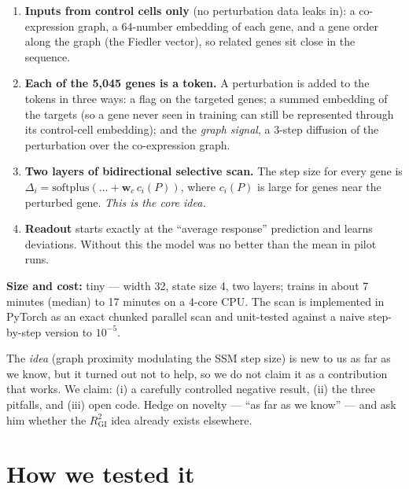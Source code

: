 \documentclass[10.5pt]{article}
\begin{document}
\begin{enumerate}
\item \textbf{Inputs from control cells only} (no perturbation data leaks in): a co-expression graph,
a 64-number embedding of each gene, and a gene order along the graph (the Fiedler vector), so related genes
sit close in the sequence.
\item \textbf{Each of the 5,045 genes is a token.} A perturbation is added to the tokens in three ways:
a flag on the targeted genes; a summed embedding of the targets (so a gene never seen in training can still be
represented through its control-cell embedding); and the \emph{graph signal}, a 3-step diffusion of the
perturbation over the co-expression graph.
\item \textbf{Two layers of bidirectional selective scan.} The step size for every gene is
$\Delta_i=\mathrm{softplus}(\ldots+\mathbf{w}_c\,c_i(P))$, where $c_i(P)$ is large for genes near the
perturbed gene. \emph{This is the core idea.}
\item \textbf{Readout} starts exactly at the ``average response'' prediction and learns deviations. Without
this the model was no better than the mean in pilot runs.
\end{enumerate}
\textbf{Size and cost:} tiny --- width 32, state size 4, two layers; trains in about 7 minutes (median) to 17
minutes on a 4-core CPU. The scan is implemented in PyTorch as an exact chunked parallel scan and unit-tested
against a naive step-by-step version to $10^{-5}$.

\begin{callout}[title={\textbf{Say this if asked ``what is new?''}}]
The \emph{idea} (graph proximity modulating the SSM step size) is new to us as far as we know, but it turned
out not to help, so we do not claim it as a contribution that works. We claim: (i) a carefully controlled
negative result, (ii) the three pitfalls, and (iii) open code. Hedge on novelty --- ``as far as we know'' ---
and ask him whether the $R^2_{\mathrm{GI}}$ idea already exists elsewhere.
\end{callout}

\section{How we tested it}
\end{document}
